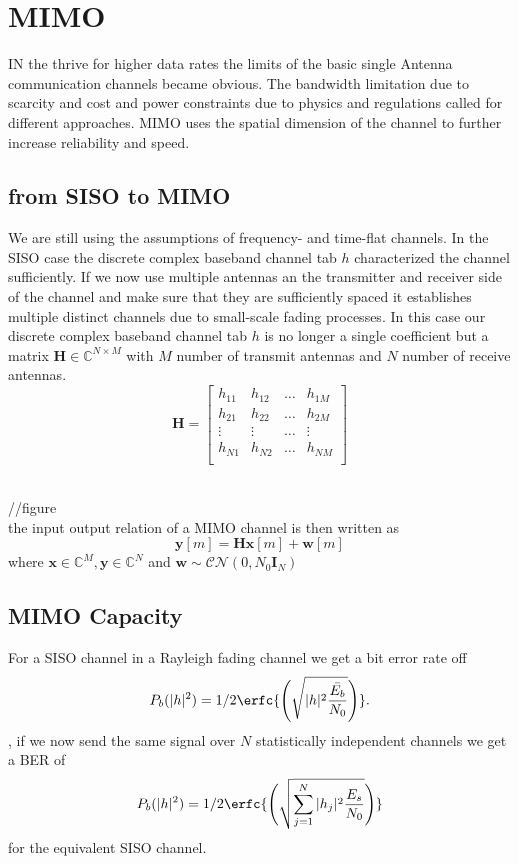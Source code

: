 \section{MIMO}
IN the thrive for higher data rates the limits of the basic single Antenna communication channels became obvious. The bandwidth limitation due to scarcity and cost and power constraints due to physics and regulations called for different approaches. MIMO uses the spatial dimension of the channel to further increase reliability and speed.

\subsection{from SISO to MIMO}
We are still using the assumptions of frequency- and time-flat channels. In the SISO case the discrete complex baseband channel tab $h$ characterized the channel sufficiently. If we now use multiple antennas an the transmitter and receiver side of the channel and make sure that they are sufficiently spaced it establishes multiple distinct channels due to small-scale fading processes. In this case our discrete complex baseband channel tab $h$ is no longer a single coefficient but a matrix $\mathbf{H}\in\mathbb{C}^{N\times M}$ with $M$ number of transmit antennas and $N$ number of receive antennas. 
\begin{equation}
	\mathbf{H} = \begin{bmatrix}
		h_{11} & h_{12} & \hdots & h_{1M} \\
		h_{21} & h_{22} & \hdots & h_{2M} \\
		\vdots & \vdots & \hdots & \vdots \\
		h_{N1} & h_{N2} & \hdots & h_{NM} \\
	\end{bmatrix}
\end{equation}

\\
//figure \\
the input output relation of a MIMO channel is then written as 
\begin{equation}
\mathbf{y}[m] = \mathbf{Hx}[m] + \mathbf{w}[m]
\end{equation}
where $\mathbf{x}\in\mathbb{C}^M , \mathbf{y}\in\mathbb{C}^N$ and $\mathbf{w}\sim\mathcal{CN}(0,N_0\mathbf{I}_N)$


\subsection{MIMO Capacity}
For a SISO channel in a Rayleigh fading channel we get a bit error rate off
\begin{equation}
	P_b(|h|^2) = 1/2 \erfc{\Biggl(\sqrt{|h|^2\frac{\bar{E_b}}{N_0}}\Biggr)}.
\end{equation}
, if we now send the same signal over $N$ statistically independent channels we get a BER of
\begin{equation}
	P_b(|h|^2) = 1/2 \erfc{\Biggl(\sqrt{\sum_{j=1}^N{|h_j|^2\frac{E_s}{N_0}}}\Biggr)}
\end{equation}
for the equivalent SISO channel.

